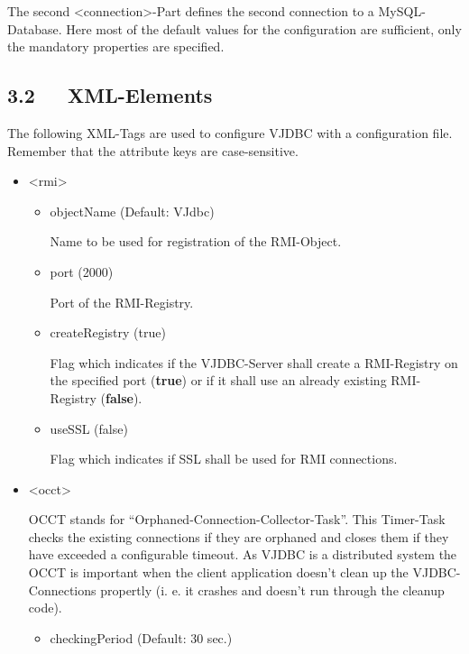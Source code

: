 \documentclass[10pt,a4paper,english]{article}
\begin{document}
The second {\textless}connection{\textgreater}-Part defines the second connection to a MySQL-Database. Here most of the default values for the configuration are sufficient, only the mandatory properties are specified.



\hypertarget{xml-elements}{}
\subsection*{3.2~~~XML-Elements}

The following XML-Tags are used to configure VJDBC with a configuration file. Remember that the attribute keys are case-sensitive.
\begin{itemize}
\item {} 
{\textless}rmi{\textgreater}
\begin{itemize}
\item {} 
objectName (Default: VJdbc)

Name to be used for registration of the RMI-Object.

\item {} 
port (2000)

Port of the RMI-Registry.

\item {} 
createRegistry (true)

Flag which indicates if the VJDBC-Server shall create a RMI-Registry on the specified port (\textbf{true}) or if it shall use an already existing RMI-Registry (\textbf{false}).

\item {} 
useSSL (false)

Flag which indicates if SSL shall be used for RMI connections.

\end{itemize}

\item {} 
{\textless}occt{\textgreater}

OCCT stands for ``Orphaned-Connection-Collector-Task''. This Timer-Task checks the existing connections if they are orphaned and closes them if they have exceeded a
configurable timeout. As VJDBC is a distributed system the OCCT is important when the client application doesn't clean up the VJDBC-Connections propertly (i. e. it 
crashes and doesn't run through the cleanup code).
\begin{itemize}
\item {} 
checkingPeriod (Default: 30 sec.)


\end{itemize}
\end{itemize}
\end{document}
